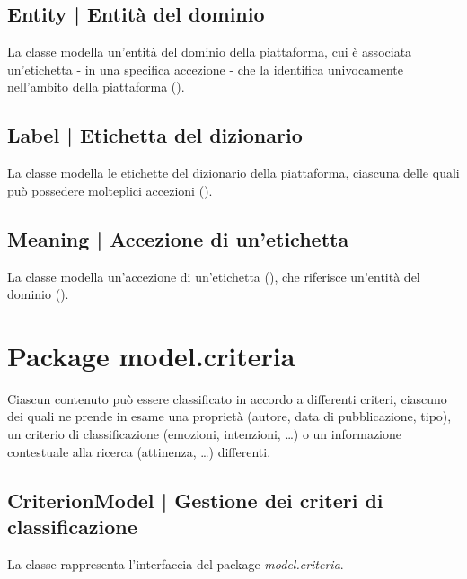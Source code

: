\documentclass[10pt,a4paper,headinclude,footinclude,hidelinks]{scrreprt} %
\begin{document}
	\subsection[Entity]{Entity | Entità del dominio}
	\label{sec:stage:design:sistema:model:entity}
	La classe modella un'entità del dominio della piattaforma, cui è associata un'etichetta - in una specifica accezione - che la identifica univocamente nell'ambito della piattaforma (\textit{}).

	\subsection[Label]{Label | Etichetta del dizionario}
	\label{sec:stage:design:sistema:model:label}
	La classe modella le etichette del dizionario della piattaforma, ciascuna delle quali può possedere molteplici accezioni (\textit{}).

	\subsection[Meaning]{Meaning | Accezione di un'etichetta}
	\label{sec:stage:design:sistema:model:meaning}
	La classe modella un'accezione di un'etichetta (\textit{}), che riferisce un'entità del dominio (\textit{}).

	\section{Package model.criteria}
	\label{sec:stage:design:sistema:model.criteria}
	Ciascun contenuto può essere classificato in accordo a differenti criteri, ciascuno dei quali ne prende in esame una proprietà (autore, data di pubblicazione, tipo), un criterio di classificazione (emozioni, intenzioni, \ldots) o un informazione contestuale alla ricerca (attinenza, \ldots) differenti.

	\subsection[CriterionModel]{CriterionModel | Gestione dei criteri di classificazione}
	\label{sec:stage:design:sistema:model.criteria:criteria-model}
	La classe \textit{} rappresenta l'interfaccia del package \textit{model.criteria}.
\end{document}
